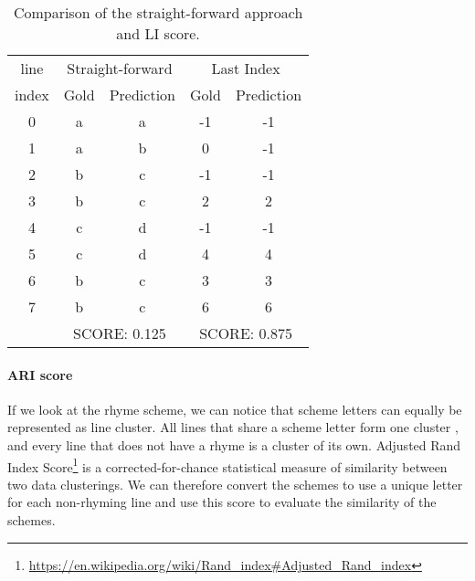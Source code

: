 \begin{table}[h!]
	\centering
	\begin{tabular}{c cc cc}\toprule
	 line &
		\multicolumn{2}{c}{Straight-forward} &
		\multicolumn{2}{c}{Last Index}\\\cmidrule(r){2-3}\cmidrule(l){4-5}
      index    & Gold & Prediction & Gold & Prediction\\\midrule
		0 & \color{OliveGreen}a		&\color{OliveGreen}a		&\color{OliveGreen}-1		&\color{OliveGreen}-1	\\
		1 & \color{Bittersweet}a		&\color{Bittersweet}b		&\color{Bittersweet}0		&\color{Bittersweet}-1	\\
		2 & \color{Bittersweet}b		&\color{Bittersweet}c		&\color{OliveGreen}-1		&\color{OliveGreen}-1\\
		3 & \color{Bittersweet}b		&\color{Bittersweet}c		&\color{OliveGreen}2		&\color{OliveGreen}2	\\
		4 & \color{Bittersweet}c		&\color{Bittersweet}d		&\color{OliveGreen}-1		&\color{OliveGreen}-1	\\
		5 & \color{Bittersweet}c		&\color{Bittersweet}d		&\color{OliveGreen}4		&\color{OliveGreen}4	\\
		6 & \color{Bittersweet}b		&\color{Bittersweet}c		&\color{OliveGreen}3		&\color{OliveGreen}3	\\
		7 & \color{Bittersweet}b		&\color{Bittersweet}c		&\color{OliveGreen}6		&\color{OliveGreen}6	\\
		\midrule
		& \multicolumn{2}{c}{SCORE: 0.125} &
		\multicolumn{2}{c}{SCORE: 0.875}\\\bottomrule
	\end{tabular}
	\caption[Comparison of the straight-forward approach and LI score.]{Comparison of the straight-forward approach and LI score.}
	\label{LI_score_example}
\end{table}


\paragraph{ARI score} If we look at the rhyme scheme, we can notice that scheme letters can equally be represented as line cluster. All lines that share a scheme letter form one cluster , and every line that does not have a rhyme is a cluster of its own. Adjusted Rand Index  Score\footnote{\url{https://en.wikipedia.org/wiki/Rand_index#Adjusted_Rand_index}} is a corrected-for-chance statistical measure of similarity between two data clusterings. We can therefore convert the schemes to use a unique letter for each non-rhyming line and use this score to evaluate the similarity of the schemes. 

